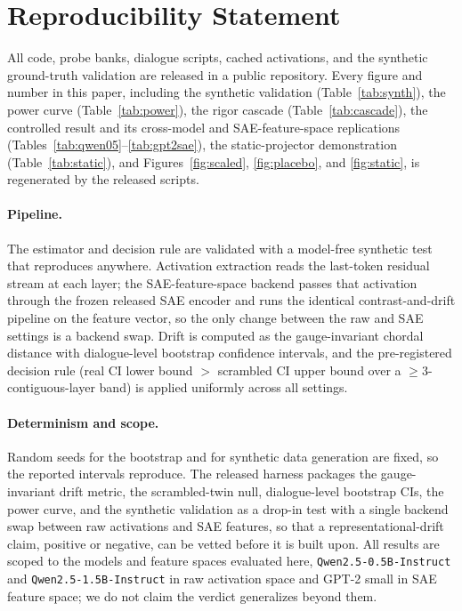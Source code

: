 \section{Reproducibility Statement}
\label{app:repro}

All code, probe banks, dialogue scripts, cached activations, and the synthetic ground-truth
validation are released in a public repository. Every figure and number in this paper, including
the synthetic validation (Table~\ref{tab:synth}), the power curve (Table~\ref{tab:power}), the
rigor cascade (Table~\ref{tab:cascade}), the controlled result and its cross-model and
SAE-feature-space replications (Tables~\ref{tab:qwen05}--\ref{tab:gpt2sae}), the static-projector
demonstration (Table~\ref{tab:static}), and Figures~\ref{fig:scaled}, \ref{fig:placebo}, and
\ref{fig:static}, is regenerated by the released scripts.

\paragraph{Pipeline.} The estimator and decision rule are validated with a model-free synthetic
test that reproduces anywhere. Activation extraction reads the last-token residual stream at each
layer; the SAE-feature-space backend passes that activation through the frozen released SAE
encoder and runs the identical contrast-and-drift pipeline on the feature vector, so the only
change between the raw and SAE settings is a backend swap. Drift is computed as the
gauge-invariant chordal distance with dialogue-level bootstrap confidence intervals, and the
pre-registered decision rule (real CI lower bound $>$ scrambled CI upper bound over a
$\geq 3$-contiguous-layer band) is applied uniformly across all settings.

\paragraph{Determinism and scope.} Random seeds for the bootstrap and for synthetic data
generation are fixed, so the reported intervals reproduce. The released harness packages the
gauge-invariant drift metric, the scrambled-twin null, dialogue-level bootstrap CIs, the power
curve, and the synthetic validation as a drop-in test with a single backend swap between raw
activations and SAE features, so that a representational-drift claim, positive or negative, can be
vetted before it is built upon. All results are scoped to the models and feature spaces evaluated
here, \texttt{Qwen2.5-0.5B-Instruct} and \texttt{Qwen2.5-1.5B-Instruct} in raw activation space and
GPT-2 small in SAE feature space; we do not claim the verdict generalizes beyond them.